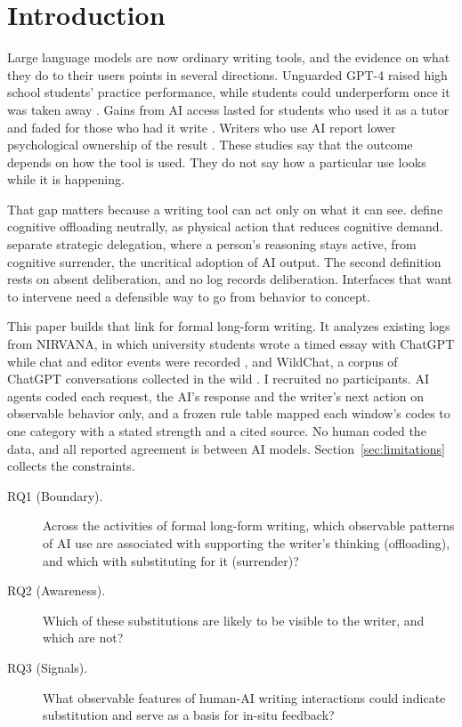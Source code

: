 \documentclass[manuscript,screen]{acmart}
\begin{document}
\maketitle

\section{Introduction}

Large language models are now ordinary writing tools, and the evidence on what they do to their users points in several directions. Unguarded GPT-4 raised high school students' practice performance, while students could underperform once it was taken away \cite{bastani2025}. Gains from AI access lasted for students who used it as a tutor and faded for those who had it write \cite{contractor2026}. Writers who use AI report lower psychological ownership of the result \cite{joshi2025}. These studies say that the outcome depends on how the tool is used. They do not say how a particular use looks while it is happening.

That gap matters because a writing tool can act only on what it can see. \citet{risko2016} define cognitive offloading neutrally, as physical action that reduces cognitive demand. \citet{shaw2026} separate strategic delegation, where a person's reasoning stays active, from cognitive surrender, the uncritical adoption of AI output. The second definition rests on absent deliberation, and no log records deliberation. Interfaces that want to intervene need a defensible way to go from behavior to concept.

This paper builds that link for formal long-form writing. It analyzes existing logs from NIRVANA, in which university students wrote a timed essay with ChatGPT while chat and editor events were recorded \cite{jelson2026nirvana}, and WildChat, a corpus of ChatGPT conversations collected in the wild \cite{zhao2024}. I recruited no participants. AI agents coded each request, the AI's response and the writer's next action on observable behavior only, and a frozen rule table mapped each window's codes to one category with a stated strength and a cited source. No human coded the data, and all reported agreement is between AI models. Section~\ref{sec:limitations} collects the constraints.

\begin{description}
  \item[RQ1 (Boundary).] Across the activities of formal long-form writing, which observable patterns of AI use are associated with supporting the writer's thinking (offloading), and which with substituting for it (surrender)?
  \item[RQ2 (Awareness).] Which of these substitutions are likely to be visible to the writer, and which are not?
  \item[RQ3 (Signals).] What observable features of human-AI writing interactions could indicate substitution and serve as a basis for in-situ feedback?
\end{description}
\end{document}
